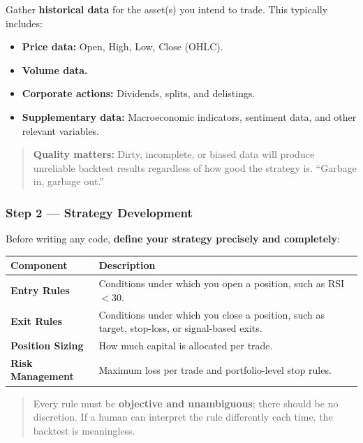 \documentclass[12pt,openany]{book}
\begin{document}
Gather \textbf{historical data} for the asset(s) you intend to trade. This typically includes:
\begin{itemize}[leftmargin=*]
    \item \textbf{Price data:} Open, High, Low, Close (OHLC).
    \item \textbf{Volume data.}
    \item \textbf{Corporate actions:} Dividends, splits, and delistings.
    \item \textbf{Supplementary data:} Macroeconomic indicators, sentiment data, and other relevant variables.
\end{itemize}

\begin{quote}
    \textbf{Quality matters:} Dirty, incomplete, or biased data will produce unreliable backtest results regardless of how good the strategy is. ``Garbage in, garbage out.''
\end{quote}

\subsubsection{Step 2 --- Strategy Development}

Before writing any code, \textbf{define your strategy precisely and completely}:

\begin{center}
\begin{tabular}{|L{0.25\textwidth}|L{0.65\textwidth}|}
\hline
\textbf{Component} & \textbf{Description} \\
\hline
\textbf{Entry Rules} & Conditions under which you open a position, such as RSI $< 30$. \\
\hline
\textbf{Exit Rules} & Conditions under which you close a position, such as target, stop-loss, or signal-based exits. \\
\hline
\textbf{Position Sizing} & How much capital is allocated per trade. \\
\hline
\textbf{Risk Management} & Maximum loss per trade and portfolio-level stop rules. \\
\hline
\end{tabular}
\end{center}

\begin{quote}
    Every rule must be \textbf{objective and unambiguous}; there should be no discretion. If a human can interpret the rule differently each time, the backtest is meaningless.
\end{quote}
\end{document}
